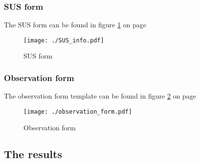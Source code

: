\documentclass[a4paper,12pt]{article}
\begin{document}
	     	\subsubsection{SUS form}
			The SUS form can be found in figure \ref{fig:SUS_form} on page \pageref{fig:SUS_form}
			\begin{figure}[htp]{
			\texttt{[image: ./SUS\_info.pdf]}}
			\caption{SUS form}\label{fig:SUS_form}
			\end{figure}
		\subsubsection{Observation form}
			The observation form template can be found in figure \ref{fig:observation_form} on page \pageref{fig:observation_form}
			\begin{figure}[htp]{
			\texttt{[image: ./observation\_form.pdf]}}
			\caption{Observation form}\label{fig:observation_form}
			\end{figure}
	\subsection{The results}
	
\end{document}
